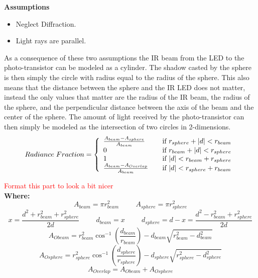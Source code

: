 \documentclass{article}
\newcommand{\xxx}[1]{\textcolor{red}{#1}}
\theoremstyle{plain}
\theoremstyle{definition}
\theoremstyle{remark}
\begin{document}
\textbf{Assumptions} \\
\begin{itemize}
\item Neglect Diffraction.
\item Light rays are parallel. 
\end{itemize}
As a consequence of these two assumptions the IR beam from the LED to the photo-transistor can be modeled as a cylinder.  The shadow casted by the sphere is then simply the circle with radius equal to the radius of the sphere.  This also means that the distance between the sphere and the IR LED does not matter, instead the only values that matter are the radius of the IR beam, the radius of the sphere, and the perpendicular distance between the axis of the beam and the center of the sphere.  The amount of light received by the photo-transistor can then simply be modeled as the intersection of two circles in 2-dimensions. \\

\[
  Radiance \hspace{0.1cm} Fraction = \left\{
  \begin{array}{l l}
    \frac{A_{beam} - A_{sphere}}{A_{beam}} & \quad \text{if } r_{sphere} + |d| < r_{beam} \\
    0 & \quad \text{if } r_{beam} + |d| < r_{sphere} \\
    1 & \quad \text{if } |d| < r_{beam} + r_{sphere} \\
    \frac{A_{beam} - A_{Overlap}}{A_{beam}} & \quad \text{if } |d| < r_{sphere} + r_{beam} \\
  \end{array} \right.
\]

\xxx{Format this part to look a bit nicer} \\
\textbf{Where:}
$$ A_{beam} = \pi r_{beam}^2 \hspace{1cm} A_{sphere} = \pi r_{sphere}^2 $$ 
$$ x = \frac{d^2+r_{beam}^2+r_{sphere}^2}{2d} \hspace{1cm} d_{beam}=x \hspace{1cm} d_{sphere}=d-x=\frac{d^2-r_{beam}^2+r_{sphere}^2}{2d} $$
$$ A_{Obeam} = r_{beam}^2 \cos^{-1} (\frac{d_{beam}}{r_{beam}})-d_{beam} \sqrt{r_{beam}^2-d_{beam}^2}$$ 
$$ A_{Osphere} = r_{sphere}^2 \cos^{-1} (\frac{d_{sphere}}{r_{sphere}})-d_{sphere} \sqrt{r_{sphere}^2-d_{sphere}^2}$$
$$ A_{Overlap} = A_{Obeam} + A_{Osphere} $$
\end{document}
